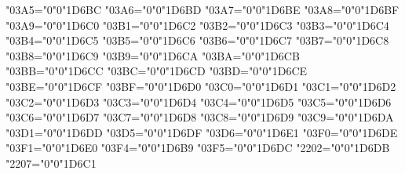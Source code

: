 {    \Umathcode"03A5="0"0"1D6BC%
    \Umathcode"03A6="0"0"1D6BD%
    \Umathcode"03A7="0"0"1D6BE%
    \Umathcode"03A8="0"0"1D6BF%
    \Umathcode"03A9="0"0"1D6C0%
    \Umathcode"03B1="0"0"1D6C2%
    \Umathcode"03B2="0"0"1D6C3%
    \Umathcode"03B3="0"0"1D6C4%
    \Umathcode"03B4="0"0"1D6C5%
    \Umathcode"03B5="0"0"1D6C6%
    \Umathcode"03B6="0"0"1D6C7%
    \Umathcode"03B7="0"0"1D6C8%
    \Umathcode"03B8="0"0"1D6C9%
    \Umathcode"03B9="0"0"1D6CA%
    \Umathcode"03BA="0"0"1D6CB%
    \Umathcode"03BB="0"0"1D6CC%
    \Umathcode"03BC="0"0"1D6CD%
    \Umathcode"03BD="0"0"1D6CE%
    \Umathcode"03BE="0"0"1D6CF%
    \Umathcode"03BF="0"0"1D6D0%
    \Umathcode"03C0="0"0"1D6D1%
    \Umathcode"03C1="0"0"1D6D2%
    \Umathcode"03C2="0"0"1D6D3%
    \Umathcode"03C3="0"0"1D6D4%
    \Umathcode"03C4="0"0"1D6D5%
    \Umathcode"03C5="0"0"1D6D6%
    \Umathcode"03C6="0"0"1D6D7%
    \Umathcode"03C7="0"0"1D6D8%
    \Umathcode"03C8="0"0"1D6D9%
    \Umathcode"03C9="0"0"1D6DA%
    \Umathcode"03D1="0"0"1D6DD%
    \Umathcode"03D5="0"0"1D6DF%
    \Umathcode"03D6="0"0"1D6E1%
    \Umathcode"03F0="0"0"1D6DE%
    \Umathcode"03F1="0"0"1D6E0%
    \Umathcode"03F4="0"0"1D6B9%
    \Umathcode"03F5="0"0"1D6DC%
    \Umathcode"2202="0"0"1D6DB%
    \Umathcode"2207="0"0"1D6C1%
    \relax
}

